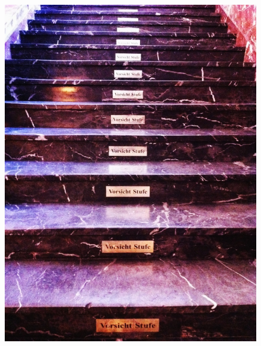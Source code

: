 \begin{frame}
\begin{figure}
\begin{minipage}[t]{0.45\textwidth}
\includegraphics[width=\textwidth]{material/15Prag3}
\end{minipage}

\end{figure}

\end{frame}
